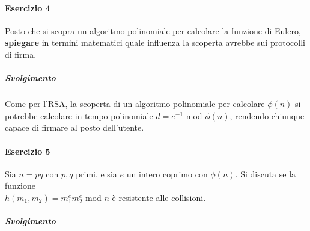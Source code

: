 \documentclass[10pt]{book}
\begin{document}
\paragraph{Esercizio 4} Posto che si scopra un algoritmo polinomiale per calcolare la funzione di Eulero, \textbf{spiegare} in termini matematici quale influenza la scoperta avrebbe sui protocolli di firma.
\subparagraph{Svolgimento} Come per l'RSA, la scoperta di un algoritmo polinomiale per calcolare $\phi(n)$ si potrebbe calcolare in tempo polinomiale $d = e^{-1}$ mod $\phi(n)$, rendendo chiunque capace di firmare al posto dell'utente.
\paragraph{Esercizio 5} Sia $n = pq$ con $p,q$ primi, e sia $e$ un intero coprimo con $\phi(n)$. Si discuta se la funzione\\ $h(m_1,m_2) = m_1^em_2^e$ mod $n$ è resistente alle collisioni.
\subparagraph{Svolgimento}
\end{document}
